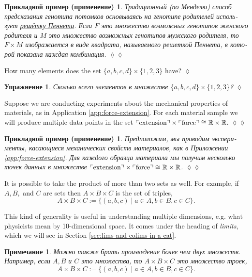 \documentclass[a4paper]{book}
\def\tn{\textnormal}
\def\RR{{\mathbb R}}
\def\iso{\cong}
\def\|{{\;|\;}}
\newcommand{\fakebox}[1]{\tn{$\ulcorner$#1$\urcorner$}}
\theoremstyle{myth}
\newtheorem{remarkENG}[envENG]{\begin{english}Remark\end{english}}
\newtheorem{excENG}[envENG]{\begin{english}Exercise\end{english}}
\newtheorem{appENG}[envENG]{\begin{english}Application\end{english}}
\newenvironment{exerciseENG}{\begin{excENG}}{\hspace*{\fill}$\lozenge$\end{excENG}}
\newenvironment{applicationENG}{\begin{appENG}}{\hspace*{\fill}$\lozenge\lozenge$\end{appENG}}
\newtheorem{remarkRUS}[envRUS]{Примечание}
\newtheorem{excRUS}[envRUS]{Упражнение}
\newtheorem{appRUS}[envRUS]{Прикладной пример (применение)}
\newenvironment{exerciseRUS}{\begin{excRUS}}{\hspace*{\fill}$\lozenge$\end{excRUS}}
\newenvironment{applicationRUS}{\begin{appRUS}}{\hspace*{\fill}$\lozenge\lozenge$\end{appRUS}}
\begin{document}
\begin{russian}
\begin{applicationRUS}
Традиционный (по Менделю) способ предсказания генотипа потомков основываясь на генотипе родителей использует \href{https://ru.wikipedia.org/wiki/%D0%A0%D0%B5%D1%88%D1%91%D1%82%D0%BA%D0%B0_%D0%9F%D0%B5%D0%BD%D0%BD%D0%B5%D1%82%D0%B0}{решётку Пеннета}. Если $F$ это множество возможных генотипов женского родителя и $M$ это множество возможных генотипов мужского родителя, то $F\times M$ изображается в виде квадрата, называемого решеткой Пеннета, в которой показана каждая комбинация. 
\end{applicationRUS}

\begin{exerciseENG}
How many elements does the set $\{a,b,c,d\}\times\{1,2,3\}$ have?
\end{exerciseENG}

\begin{exerciseRUS}
Сколько всего элементов в множестве $\{a,b,c,d\}\times\{1,2,3\}$?
\end{exerciseRUS}

\begin{applicationENG}
Suppose we are conducting experiments about the mechanical properties of materials, as in Application \ref{app:force-extension}. For each material sample we will produce multiple data points in the set $\fakebox{extension}\times\fakebox{force}\iso\RR\times\RR$.
\end{applicationENG}

\begin{applicationRUS}
Предположим, мы проводим эксперименты, касающиеся механических свойств материалов, как в Приложении \ref{app:force-extension}. Для каждого образца материала мы получим несколько точек данных в множестве $\fakebox{extension}\times\fakebox{force}\iso\RR\times\RR$.
\end{applicationRUS}

\begin{remarkENG}
It is possible to take the product of more than two sets as well. For example, if $A,B,$ and $C$ are sets then $A\times B\times C$ is the set of triples, 
$$A\times B\times C:=\{(a,b,c)\|a\in A, b\in B, c\in C\}.$$

This kind of generality is useful in understanding multiple dimensions, e.g. what physicists mean by 10-dimensional space. It comes under the heading of {\em limits}, which we will see in Section \ref{sec:lims and colims in a cat}.
\end{remarkENG}

\begin{remarkRUS}
Можно также брать произведение более чем двух множеств. Например, если $A,B$ и $C$ это множества, то $A\times B\times C$ это множество троек, 
$$A\times B\times C:=\{(a,b,c)\|a\in A, b\in B, c\in C\}.$$


\end{remarkRUS}
\end{russian}
\end{document}

